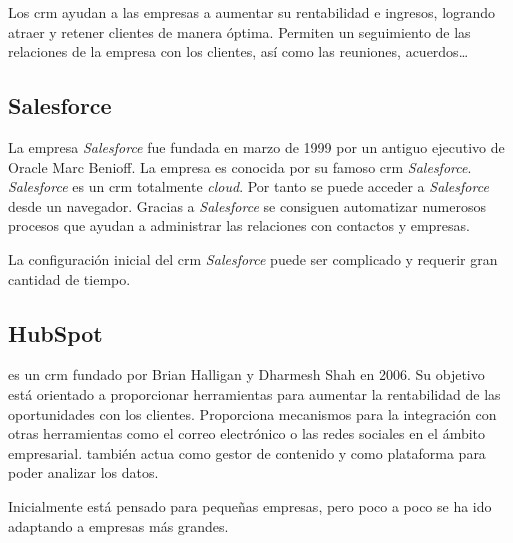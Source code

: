 Los \acrshort{crm} ayudan a las empresas a aumentar su rentabilidad e ingresos, logrando atraer y retener clientes de manera óptima. 
Permiten un seguimiento de las relaciones de la empresa con los clientes, así como las reuniones, acuerdos\ldots


\subsection{Salesforce}
La empresa \textit{Salesforce} fue fundada en marzo de 1999 por un antiguo ejecutivo de Oracle Marc Benioff. La empresa es conocida por su famoso \acrshort{crm}
\textit{Salesforce}. \textit{Salesforce} es un \acrshort{crm} totalmente \textit{cloud}. Por tanto se puede acceder a \textit{Salesforce} desde un navegador. Gracias a \textit{Salesforce} se consiguen automatizar numerosos procesos que ayudan a administrar las relaciones con contactos y empresas.

La configuración inicial del \acrshort{crm} \textit{Salesforce} puede ser complicado y requerir gran cantidad de tiempo.


\subsection{HubSpot}

\hs{} es un \acrshort{crm} fundado por Brian Halligan y Dharmesh Shah en 2006. Su objetivo está orientado a proporcionar herramientas para aumentar la rentabilidad de las oportunidades con los clientes. Proporciona mecanismos para la integración con otras herramientas como el correo electrónico o las redes sociales en el ámbito empresarial. \hs{} también actua como gestor de contenido y como plataforma para poder analizar los datos.

Inicialmente está pensado para pequeñas empresas, pero poco a poco se ha ido adaptando a empresas más grandes.
